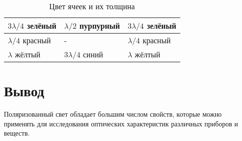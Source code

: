 \documentclass[a4paper]{article}
\begin{document}
    \begin{table}[h]
    \centering
    \begin{center}
    \caption{Цвет ячеек и их толщина}
    \end{center}
    \vspace{0.1cm}
    \label{tab:my_label}
    \begin{tabular}{ |p{2.5cm}|p{2.5cm}|p{2.5cm}|}
 \hline
 $3\lambda/4$ зелёный & $\lambda/2$ пурпурный & $3\lambda/4$ зелёный\\
\hline
 $\lambda/4$ красный & - & $\lambda/4$ красный \\
\hline
 $\lambda$ жёлтый & $3\lambda/4$ синий & $\lambda$ жёлтый \\
\hline
 
\end{tabular}
\end{table}

\section{Вывод}
Поляризованный свет обладает большим числом свойств, которые можно
применять для исследования оптических характеристик различных приборов и
веществ.
\end{document}

